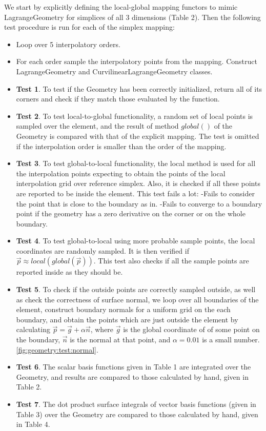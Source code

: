 \noindent
We start by explicitly defining the local-global mapping functors to mimic LagrangeGeometry for simplices of all 3 dimensions (Table 2). Then the following test procedure is run for each of the simplex mapping:
\begin{itemize}
	\item Loop over 5 interpolatory orders.
	\item For each order sample the interpolatory points from the mapping. Construct LagrangeGeometry and CurvilinearLagrangeGeometry classes.
	\item \textbf{Test 1}. To test if the Geometry has been correctly initialized, return all of its corners and check if they match those evaluated by the function.
	\item \textbf{Test 2}. To test local-to-global functionality, a random set of local points is sampled over the element, and the result of method $global()$ of the Geometry is compared with that of the explicit mapping. The test is omitted if the interpolation order is smaller than the order of the mapping.
	\item \textbf{Test 3}. To test global-to-local functionality, the local method is used for all the interpolation points expecting to obtain the points of the local interpolation grid over reference simplex. Also, it is checked if all these points are reported to be inside the element. This test fails a lot:
		\subitem -Fails to consider the point that is close to the boundary as in.
		\subitem -Fails to converge to a boundary point if the geometry has a zero derivative on the corner or on the whole boundary.
	\item \textbf{Test 4}. To test global-to-local using more probable sample points, the local coordinates are randomly sampled. It is then verified if $\vec{p} \approx local(global(\vec{p}))$. This test also checks if all the sample points are reported inside as they should be.
	\item \textbf{Test 5}. To check if the outside points are correctly sampled outside, as well as check the correctness of surface normal, we loop over all boundaries of the element, construct boundary normals for a uniform grid on the each boundary, and obtain the points which are just outside the element by calculating $\vec{p} = \vec{g} + \alpha \vec{n}$, where $\vec{g}$ is the global coordinate of of some point on the boundary, $\vec{n}$ is the normal at that point, and $\alpha = 0.01$ is a small number. \cref{fig:geometry:test:normal}.
	\item \textbf{Test 6}. The scalar basis functions given in Table 1 are integrated over the Geometry, and results are compared to those calculated by hand, given in Table 2.
	\item \textbf{Test 7}. The dot product surface integrals of vector basis functions (given in Table 3) over the Geometry are compared to those calculated by hand, given in Table 4.
\end{itemize}

